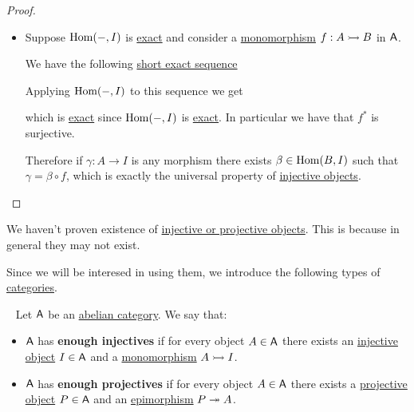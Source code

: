 \documentclass[../../../main]{subfiles}
\begin{document}
\begin{proof}
\begin{itemize}
    \item[\(\impliedby\)] Suppose \(\operatorname{Hom}(-, I)\) is \hyperref[def:exact-complex-functor]{exact} and consider a \hyperref[def:mono-epi-morphism]{monomorphism} \(f: A \rightarrowtail B\) in \(\mathsf{A}\).

          We have the following \hyperref[def:short-exact-sequence]{short exact sequence}
          \begin{center}
          \end{center}
          Applying \(\operatorname{Hom}(-, I)\) to this sequence we get
           \begin{center}
          \end{center}
          which is \hyperref[def:short-exact-sequence]{exact} since \(\operatorname{Hom}(-, I)\) is \hyperref[def:exact-complex-functor]{exact}.
          In particular we have that \(f^{\ast}\) is surjective.

          Therefore if \(\gamma: A \to I\) is any morphism there exists \(\beta \in \operatorname{Hom}(B, I)\) such that \(\gamma = \beta \circ f\), which is exactly the universal property of \hyperref[def:injective-projective-object]{injective objects}.
  \end{itemize}
\end{proof}

We haven't proven existence of \hyperref[def:injective-projective-object]{injective or projective objects}.
This is because in general they may not exist.

Since we will be interesed in using them, we introduce the following types of \hyperref[def:big-category]{categories}.
\begin{definition} \label{def:enough-injectives-projectives}~
  Let \(\mathsf{A}\) be an \hyperref[def:abelian-category]{abelian category}. We say that:
  \begin{itemize}
    \item \(\mathsf{A}\) has \textbf{enough injectives} if for every object \(A \in \mathsf{A}\) there exists an \hyperref[def:injective-projective-object]{injective object} \(I \in \mathsf{A}\) and a \hyperref[def:mono-epi-morphism]{monomorphism} \(A \rightarrowtail I\).
    \item \(\mathsf{A}\) has \textbf{enough projectives} if for every object \(A \in \mathsf{A}\) there exists a \hyperref[def:injective-projective-object]{projective object} \(P \in \mathsf{A}\) and an \hyperref[def:mono-epi-morphism]{epimorphism} \(P \twoheadrightarrow A\).
  \end{itemize}
\end{definition}
\end{document}
